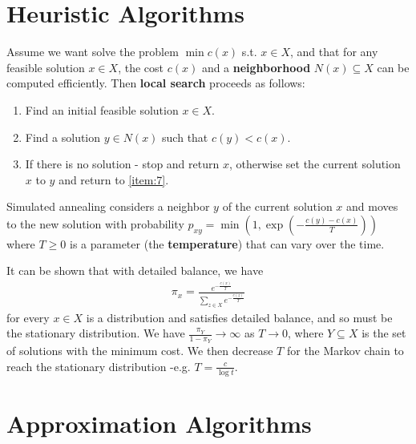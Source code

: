 \section{Heuristic Algorithms}
\label{sec:heuristic-algorithms}

\begin{defn}
  \label{sec:heuristic-algorithms-1}
  Assume we want solve the problem $\min c(x)$ s.t. $x \in X$, and
  that for any feasible solution $x \in X$, the cost $c(x)$ and a
  \textbf{neighborhood} $N(x) \subseteq X$ can be computed
  efficiently.  Then \textbf{local search} proceeds as follows:
  \begin{enumerate}
  \item Find an initial feasible solution $x \in X$.
  \item\label{item:7} Find a solution $y \in N(x)$ such that $c(y) < c(x)$.
  \item If there is no solution - stop and return $x$, otherwise set
    the current solution $x$ to $y$ and return to \ref{item:7}.
  \end{enumerate}
\end{defn}

\begin{defn}
  \label{sec:heuristic-algorithms-2}
  Simulated annealing considers a neighbor $y$ of the current
  solution $x$ and moves to the new solution with probability $p_{xy}
  = \min(1, \exp(-\frac{c(y) - c(x)}{T}))$ where $T \geq 0$ is a
  parameter (the \textbf{temperature}) that can vary over the time.

  It can be shown that with detailed balance, we have
  \begin{align}
    \label{eq:14}
    \pi_{x} = \frac{e^{-\frac{c(x)}{T}}}{\sum_{z \in X}^{} e^{-\frac{c(z)}{T}}}
  \end{align} for every $x \in X$ is a distribution and satisfies
  detailed balance, and so must be the stationary distribution.
  We have $\frac{\pi_{Y}}{1 - \pi_{Y}} \rightarrow \infty$ as $T
  \rightarrow 0$, where $Y \subseteq X$ is the set of solutions with
  the minimum cost. We then decrease $T$ for the Markov chain to reach
  the stationary distribution -e.g. $T = \frac{c}{\log t}$.
\end{defn}

\section{Approximation Algorithms}
\label{sec:appr-algor}

